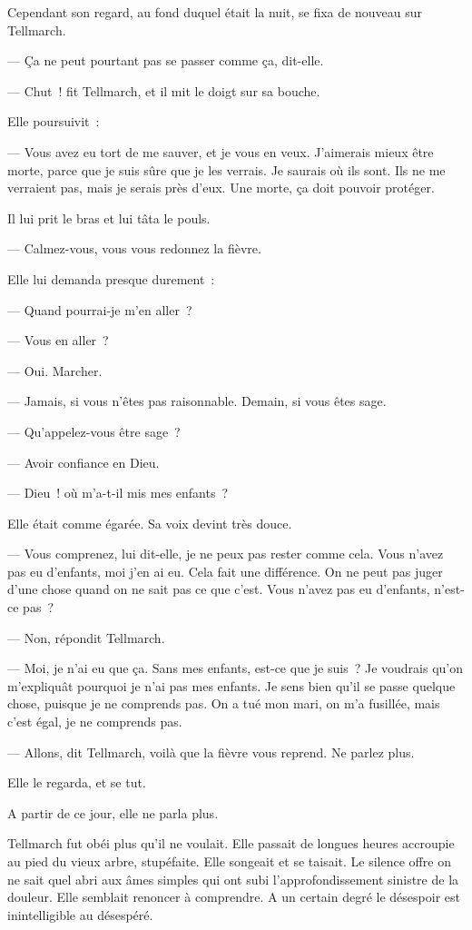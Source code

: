 \documentclass[french,twoside]{book} %
\begin{document}
Cependant son regard, au fond duquel était la nuit, se fixa de nouveau sur Tellmarch.\par
— Ça ne peut pourtant pas se passer comme ça, dit-elle.\par
— Chut ! fit Tellmarch, et il mit le doigt sur sa bouche.\par
Elle poursuivit :\par
— Vous avez eu tort de me sauver, et je vous en  veux. J’aimerais mieux être morte, parce que je suis sûre que je les verrais. Je saurais où ils sont. Ils ne me verraient pas, mais je serais près d’eux. Une morte, ça doit pouvoir protéger.\par
Il lui prit le bras et lui tâta le pouls.\par
— Calmez-vous, vous vous redonnez la fièvre.\par
Elle lui demanda presque durement :\par
— Quand pourrai-je m’en aller ?\par
— Vous en aller ?\par
— Oui. Marcher.\par
— Jamais, si vous n’êtes pas raisonnable. Demain, si vous êtes sage.\par
— Qu’appelez-vous être sage ?\par
— Avoir confiance en Dieu.\par
— Dieu ! où m’a-t-il mis mes enfants ?\par
Elle était comme égarée. Sa voix devint très douce.\par
— Vous comprenez, lui dit-elle, je ne peux pas rester comme cela. Vous n’avez pas eu d’enfants, moi j’en ai eu. Cela fait une différence. On ne peut pas juger d’une chose quand on ne sait pas ce que c’est. Vous n’avez pas eu d’enfants, n’est-ce pas ?\par
— Non, répondit Tellmarch.\par
— Moi, je n’ai eu que ça. Sans mes enfants, est-ce que je suis ? Je voudrais qu’on m’expliquât pourquoi je n’ai pas mes enfants. Je sens bien qu’il se passe quelque chose, puisque je ne comprends pas. On a tué mon mari, on m’a fusillée, mais c’est égal, je ne comprends pas.\par
— Allons, dit Tellmarch, voilà que la fièvre vous reprend. Ne parlez plus.\par
 Elle le regarda, et se tut.\par
A partir de ce jour, elle ne parla plus.\par
Tellmarch fut obéi plus qu’il ne voulait. Elle passait de longues heures accroupie au pied du vieux arbre, stupéfaite. Elle songeait et se taisait. Le silence offre on ne sait quel abri aux âmes simples qui ont subi l’approfondissement sinistre de la douleur. Elle semblait renoncer à comprendre. A un certain degré le désespoir est inintelligible au désespéré.\par
\end{document}
